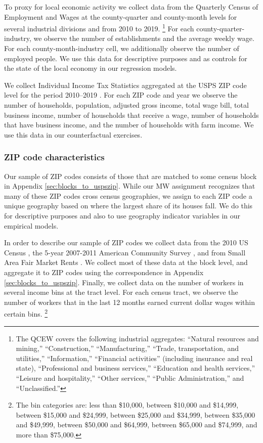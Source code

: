 To proxy for local economic activity we collect data from the 
Quarterly Census of Employment and Wages \parencite[QCEW;][]{QCEW} 
at the county-quarter and county-month levels for several industrial divisions 
and from 2010 to 2019.%
\footnote{The QCEW covers the following industrial aggregates: 
``Natural resources and mining,'' ``Construction,'' ``Manufacturing,'' 
``Trade, transportation, and utilities,'' ``Information,'' 
``Financial activities'' (including insurance and real state), 
``Professional and business services,'' ``Education and health services,'' 
``Leisure and hospitality,'' ``Other services,'' ``Public Administration,''
and ``Unclassified.''}
For each county-quarter-industry, we observe the number of establishments and 
the average weekly wage.
For each county-month-industry cell, we additionally observe the number of 
employed people.
We use this data for descriptive purposes and as controls for the state of 
the local economy in our regression models.

We collect Individual Income Tax Statistics aggregated at the USPS ZIP code 
level for the period 2010--2019 \parencite{IRS}.
For each ZIP code and year we observe the number of households, population, 
adjusted gross income, total wage bill, total business income, number of 
households that receive a wage, number of households that have business income, 
and the number of households with farm income.
We use this data in our counterfactual exercises.

\subsubsection{ZIP code characteristics}
\label{sec:data_other_cross}

Our sample of ZIP codes consists of those that are matched to some census block 
in Appendix \ref{sec:blocks_to_uspszip}.
While our MW assignment recognizes that many of these ZIP codes cross census 
geographies, we assign to each ZIP code a unique geography based on where the 
largest share of its houses fall.
We do this for descriptive purposes and also to use geography indicator 
variables in our empirical models.

In order to describe our sample of ZIP codes we collect data from the 
2010 US Census \parencite{CensusDecennial}, 
the 5-year 2007-2011 American Community Survey \parencite[ACS;][]{CensusACS}, and 
from Small Area Fair Market Rents \parencite[SAFMR;][]{hudSAFMR}.
We collect most of these data at the block level, and aggregate it to ZIP codes
using the correspondence in Appendix \ref{sec:blocks_to_uspszip}.
Finally, we collect data on the number of workers in several income bins at
the tract level.
For each census tract, we observe the number of workers that in the last 12 
months earned current dollar wages within certain bins.%
\footnote{The bin categories are: 
less than \$10,000, between \$10,000 and \$14,999, between \$15,000 and \$24,999, 
between \$25,000 and \$34,999, between \$35,000 and \$49,999, between \$50,000 and \$64,999,
between \$65,000 and \$74,999, and more than \$75,000.}

